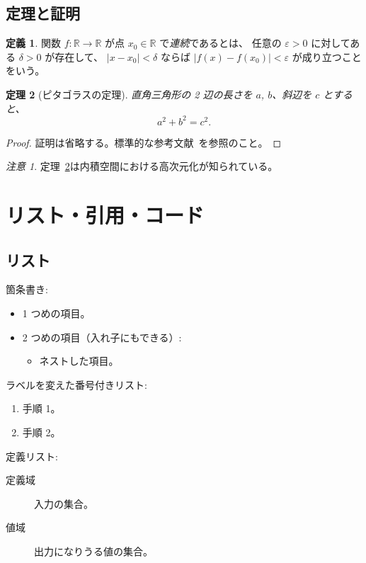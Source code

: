 \documentclass[a4paper,11pt]{ltjsarticle}
\theoremstyle{plain}
\newtheorem{theorem}{定理}[section]
\theoremstyle{definition}
\newtheorem{definition}[theorem]{定義}
\theoremstyle{remark}
\newtheorem*{remark}{注意}
\newcommand{\R}{\mathbb{R}}
\newcommand{\abs}[1]{\left\lvert #1 \right\rvert}
\begin{document}
\subsection{定理と証明}

\begin{definition}
  関数 $f \colon \R \to \R$ が点 $x_0 \in \R$ で\emph{連続}であるとは、
  任意の $\varepsilon > 0$ に対してある $\delta > 0$ が存在して、
  $\abs{x - x_0} < \delta$ ならば $\abs{f(x) - f(x_0)} < \varepsilon$ が成り立つことをいう。
\end{definition}

\begin{theorem}[ピタゴラスの定理]
  \label{thm:pythagoras}
  直角三角形の 2 辺の長さを $a$, $b$、斜辺を $c$ とすると、
  \[
    a^2 + b^2 = c^2.
  \]
\end{theorem}

\begin{proof}
  証明は省略する。標準的な参考文献~\cite{euclid}を参照のこと。
\end{proof}

\begin{remark}
  定理~\ref{thm:pythagoras}は内積空間における高次元化が知られている。
\end{remark}

\section{リスト・引用・コード}

\subsection{リスト}

箇条書き:
\begin{itemize}
  \item 1 つめの項目。
  \item 2 つめの項目（入れ子にもできる）:
  \begin{itemize}
    \item ネストした項目。
  \end{itemize}
\end{itemize}

ラベルを変えた番号付きリスト:
\begin{enumerate}[label=(\alph*)]
  \item 手順 1。
  \item 手順 2。
\end{enumerate}

定義リスト:
\begin{description}
  \item[定義域] 入力の集合。
  \item[値域] 出力になりうる値の集合。
\end{description}
\end{document}
